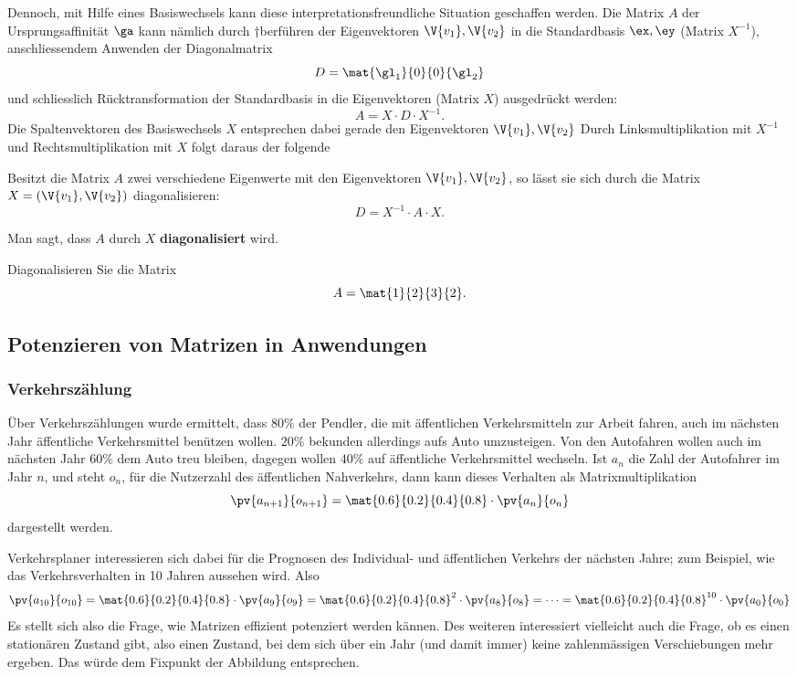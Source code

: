 \documentclass[%
11pt,%
twoside,%
titlepage,%
german,%
headsepline%
]{scrartcl}
\begin{document}
Dennoch, mit Hilfe eines Basiswechsels kann diese interpretationsfreundliche Situation geschaffen werden. Die Matrix $A$ der Ursprungsaffinität $\ga$ kann nämlich durch †berführen der Eigenvektoren $\V{v_1}, \V{v_2}$ in die Standardbasis $\ex, \ey$ (Matrix $X^{-1}$), anschliessendem Anwenden der Diagonalmatrix
$$D=\mat{\gl_1}{0}{0}{\gl_2}$$
und schliesslich Rücktransformation der
Standardbasis in die Eigenvektoren (Matrix $X$) ausgedrückt werden:
$$A=X\cdot D\cdot X^{-1}.$$
Die Spaltenvektoren des Basiswechsels $X$ entsprechen dabei gerade den Eigenvektoren $\V{v_1}, \V{v_2}$ Durch Linksmultiplikation mit $X^{-1}$ und Rechtsmultiplikation mit $X$ folgt daraus der folgende

\begin{satz}
Besitzt die Matrix $A$ zwei verschiedene Eigenwerte mit den Eigenvektoren $\V{v_1}, \V{v_2}$, so lässt sie sich durch die Matrix $X=(\V{v_1}, \V{v_2})$ diagonalisieren:
$$D=X^{-1}\cdot A\cdot X.$$
\end{satz}

Man sagt, dass $A$ durch $X$ \textbf{diagonalisiert} wird.

\begin{ueb}
Diagonalisieren Sie die Matrix
$$A=\mat{1}{2}{3}{2}.$$
\end{ueb}

\subsection{Potenzieren von Matrizen in Anwendungen}

\subsubsection{Verkehrszählung}

\begin{bsp}
Über Verkehrszählungen wurde ermittelt, dass $80\%$ der Pendler, die mit äffentlichen Verkehrsmitteln zur Arbeit fahren, auch im nächsten Jahr äffentliche Verkehrsmittel benützen wollen. $20\%$ bekunden allerdings aufs Auto umzusteigen. Von den Autofahren wollen auch im nächsten Jahr $60\%$ dem Auto treu bleiben, dagegen wollen $40\%$ auf äffentliche Verkehrsmittel wechseln. Ist $a_n$ die Zahl der Autofahrer im Jahr $n$, und steht $o_n$, für die Nutzerzahl des äffentlichen Nahverkehrs, dann kann dieses Verhalten als Matrixmultiplikation
$$\pv{a_{n+1}}{o_{n+1}}=\mat{0.6}{0.2}{0.4}{0.8}\cdot\pv{a_n}{o_n}$$
dargestellt werden.

Verkehrsplaner interessieren sich dabei für die Prognosen des Individual- und äffentlichen Verkehrs der nächsten Jahre; zum Beispiel, wie das Verkehrsverhalten in 10 Jahren aussehen wird. Also
$$
\pv{a_{10}}{o_{10}}=\mat{0.6}{0.2}{0.4}{0.8}\cdot\pv{a_9}{o_9}=\mat{0.6}{0.2}{0.4}{0.8}^2\cdot\pv{a_8}{o_8}=\dots=\mat{0.6}{0.2}{0.4}{0.8}^{10}\cdot\pv{a_0}{o_0}
$$
Es stellt sich also die Frage, wie Matrizen effizient potenziert werden kännen. Des weiteren interessiert vielleicht auch die Frage, ob es einen stationären Zustand gibt, also einen Zustand, bei dem sich über ein Jahr (und damit immer) keine zahlenmässigen Verschiebungen mehr ergeben. Das würde dem Fixpunkt der Abbildung entsprechen.
\end{bsp}
\end{document}
